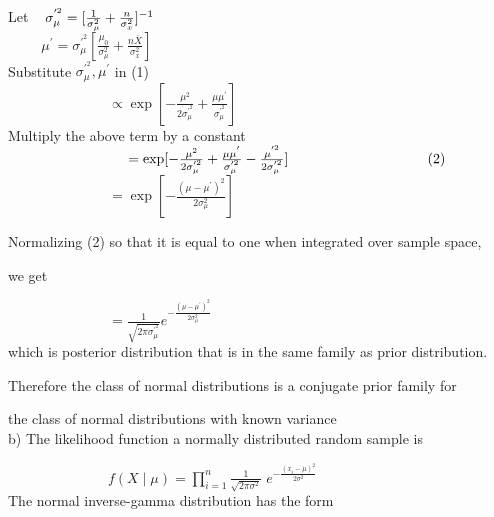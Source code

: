 \documentclass[]{article}
\begin{document}
Let  $\hspace{0.3cm}\sigma_{\mu}^{'^{2}} = [\frac{1}{\sigma_{\mu}^{2}}+\frac{n}{\sigma_{x}^{2}}]^{-1}$\\

$\hspace{1cm} \mu^{'} = \sigma_{\mu}^{'^{2}}[\frac{\mu_{0}}{\sigma_{\mu}^{2}}+\frac{n\bar X}{\sigma_{x}^{2}}]$\\

Substitute $\sigma_{\mu}^{'^{2}}, \mu^{'}$ in (1)\\

$\hspace{3cm}\propto \exp[-\frac{\mu^{2}}{2\sigma_{\mu}^{'^{2}}}+\frac{\mu \mu^{'}}{\sigma_{\mu}^{'^{2}}}]$\\

Multiply the above term by a constant\\

$\hspace{3cm} = \exp[-\frac{\mu^{2}}{2\sigma_{\mu}^{'^{2}}}+\frac{\mu \mu^{'}}{\sigma_{\mu}^{'^{2}}}-\frac{\mu^{'^{2}}}{2\sigma_{\mu}^{'^{2}}}] \hspace{3.5cm} (2)$\\

$\hspace{3cm} = \exp[-\frac{(\mu-\mu^{'})^{2}}{2\sigma_{\mu}^{2}}]$

Normalizing (2) so that it is equal to one when integrated over sample space, 

we get

$\hspace{3cm} = \frac{1}{\sqrt{2\pi \sigma_{\mu}^{'^{2}}}} e^{-\frac{(\mu-\mu^{'})^{2}}{2\sigma_{\mu}^{2}}}$\\

which is posterior distribution that is in the same family as prior distribution.

Therefore the class of normal distributions is a conjugate prior family for 

the class of normal distributions with known variance\\ 

b) The likelihood function a normally distributed random sample is 

$\hspace{3cm}f(X \mid \mu) = \prod_{i=1}^{n} \frac{1}{\sqrt{2\pi \sigma^{2}}} \;e^{-\frac{(x_{i}-\mu)^{2}}{2\sigma^{2}}}$\\

The normal inverse-gamma distribution has the form\\
\end{document}
